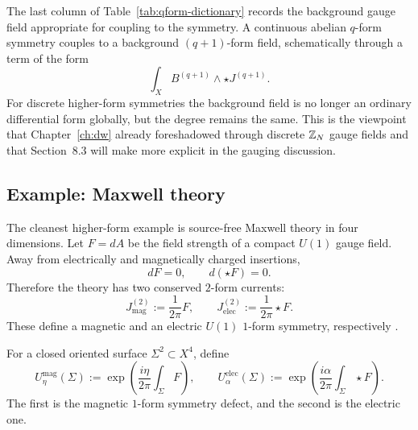 \begin{remark}\label{rem:qform-background}
The last column of Table~\ref{tab:qform-dictionary} records the background gauge field appropriate for coupling to the symmetry. A continuous abelian $q$-form symmetry couples to a background $(q+1)$-form field, schematically through a term of the form
\begin{equation}\label{eq:qform-background-coupling}
\int_X B^{(q+1)}\wedge \star J^{(q+1)}.
\end{equation}
For discrete higher-form symmetries the background field is no longer an ordinary differential form globally, but the degree remains the same. This is the viewpoint that Chapter~\ref{ch:dw} already foreshadowed through discrete $\mathbb{Z}_N$ gauge fields and that Section~8.3 will make more explicit in the gauging discussion.
\end{remark}

\subsection{Example: Maxwell theory}

The cleanest higher-form example is source-free Maxwell theory in four dimensions. Let $F=dA$ be the field strength of a compact $U(1)$ gauge field. Away from electrically and magnetically charged insertions,
\begin{equation}\label{eq:maxwell-closed}
dF=0,
\qquad
d(\star F)=0.
\end{equation}
Therefore the theory has two conserved $2$-form currents:
\begin{equation}\label{eq:maxwell-currents}
J_{\mathrm{mag}}^{(2)}:=\frac{1}{2\pi}F,
\qquad
J_{\mathrm{elec}}^{(2)}:=\frac{1}{2\pi}\star F.
\end{equation}
These define a magnetic and an electric $U(1)$ $1$-form symmetry, respectively \cite{GKSW2015,Bhardwaj2023Lectures}.

\begin{definition}\label{def:maxwell-one-form}
For a closed oriented surface $\Sigma^2\subset X^4$, define
\begin{equation}\label{eq:maxwell-defects}
U^{\mathrm{mag}}_{\eta}(\Sigma)
:=
\exp\!\left(\frac{i\eta}{2\pi}\int_\Sigma F\right),
\qquad
U^{\mathrm{elec}}_{\alpha}(\Sigma)
:=
\exp\!\left(\frac{i\alpha}{2\pi}\int_\Sigma \star F\right).
\end{equation}
The first is the magnetic $1$-form symmetry defect, and the second is the electric one.
\end{definition}

